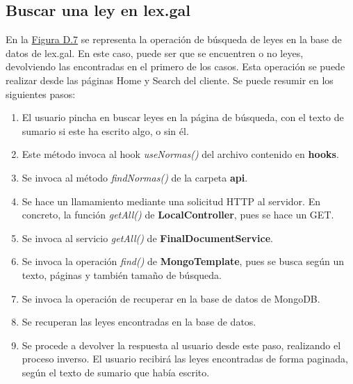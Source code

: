 \subsection{Buscar una ley en lex.gal}

En la \hyperref[enlaceDBuscarLEXGAL]{Figura D.7} se representa la operación de búsqueda de leyes en la base de datos de lex.gal. En este caso, puede ser que se encuentren o no leyes, devolviendo las encontradas en el primero de los casos. Esta operación se puede realizar desde las páginas Home y Search del cliente. Se puede resumir en los siguientes pasos:

\begin{enumerate}
    \item El usuario pincha en buscar leyes en la página de búsqueda, con el texto de sumario si este ha escrito algo, o sin él.
    \item Este método invoca al hook {\it useNormas()} del archivo contenido en {\bf hooks}.
    \item Se invoca al método {\it findNormas()} de la carpeta {\bf api}.
    \item Se hace un llamamiento mediante una solicitud HTTP al servidor. En concreto, la función {\it getAll()} de {\bf LocalController}, pues se hace un GET.
    \item Se invoca al servicio {\it getAll()} de {\bf FinalDocumentService}.
    \item Se invoca la operación {\it find()} de {\bf MongoTemplate}, pues se busca según un texto, páginas y también tamaño de búsqueda.
    \item Se invoca la operación de recuperar en la base de datos de MongoDB.
    \item Se recuperan las leyes encontradas en la base de datos.
    \item Se procede a devolver la respuesta al usuario desde este paso, realizando el proceso inverso. El usuario recibirá las leyes encontradas de forma paginada, según el texto de sumario que había escrito.
\end{enumerate}